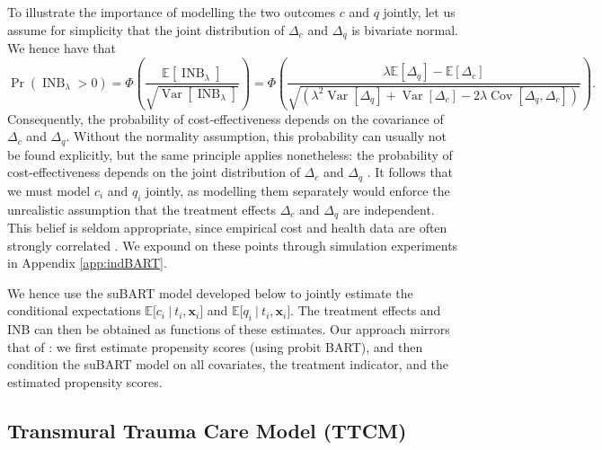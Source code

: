 \documentclass[aoas,preprint]{imsart}
\newcommand\given[1][]{\:#1\vert\:}
\theoremstyle{plain}
\theoremstyle{definition}
\theoremstyle{remark}
\begin{document}
To illustrate the importance of modelling the two outcomes $c$ and $q$ jointly, let us assume for simplicity that the joint distribution of $\Delta_c$ and $\Delta_q$ is bivariate normal. We hence have that
\[
\Pr\left(\operatorname{INB}_{\lambda} > 0\right) = \Phi\!\left(\!\frac{\mathbb{E}\!\left\lbrack \operatorname{INB}_{\lambda} \right\rbrack}{\sqrt{\operatorname{Var}\!\left\lbrack \operatorname{INB}_{\lambda} \right\rbrack}}\!\right) = \Phi\!\left(\!\frac{\lambda \mathbb{E}\!\left\lbrack \Delta_q \right\rbrack - \mathbb{E}\!\left\lbrack \Delta_c \right\rbrack}{\sqrt{\left(\lambda^2 \operatorname{Var}\!\left\lbrack \Delta_q \right\rbrack + \operatorname{Var}\!\left\lbrack \Delta_c \right\rbrack - 2 \lambda \operatorname{Cov}\!\left\lbrack \Delta_q, \Delta_c \right\rbrack \right)}}\!\right).
\]
Consequently, the probability of cost-effectiveness depends on the covariance of $\Delta_c$ and $\Delta_q$. Without the normality assumption, this probability can usually not be found explicitly, but the same principle applies nonetheless: the probability of cost-effectiveness depends on the joint distribution of $\Delta_c$ and $\Delta_q$ \citep{lothgren2000definition, gabrio2019bayesian}. It follows that we must model $c_i$ and $q_i$ jointly, as modelling them separately would enforce the unrealistic assumption that the treatment effects $\Delta_c$ and $\Delta_q$ are independent. This belief is seldom appropriate, since empirical cost and health data are often strongly correlated \citep{willan2004regression}. We expound on these points through simulation experiments in Appendix \ref{app:indBART}.

We hence use the suBART model developed below to jointly estimate the conditional expectations $\mathbb{E}\lbrack c_i\given t_i, \mathbf{x}_i\rbrack$ and $\mathbb{E}\lbrack q_i\given t_i, \mathbf{x}_i\rbrack$. The treatment effects and INB can then be obtained as functions of these estimates. Our approach mirrors that of \citet{hahn2020bayesian}: we first estimate propensity scores (using probit BART), and then condition the suBART model on all covariates, the treatment indicator, and the estimated propensity scores.

\subsection{Transmural Trauma Care Model (TTCM)}\label{sec:TTCM_intro}
\end{document}
